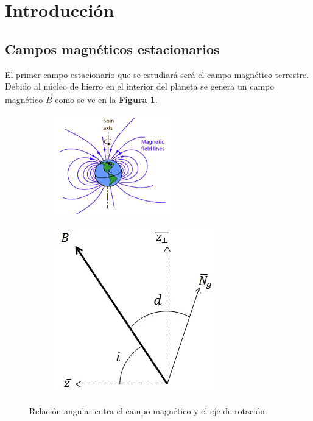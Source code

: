 \documentclass[11pt,a4paper]{article}
\begin{document}
\section{Introducción}\label{sec:intro}

\subsection{Campos magnéticos estacionarios}

El primer campo estacionario que se estudiará será el campo magnético terrestre. Debido al núcleo de hierro en el interior del planeta se genera un campo magnético $\vec{B}$ como se ve en la \textbf{Figura \ref{subfig:Campo_B}}.

\begin{figure}[h]

\begin{subfigure}{0.5\textwidth}
\centering
\includegraphics[scale=.8]{Campo.png}
	\label{subfig:Campo_B}
\end{subfigure}
\begin{subfigure}{0.5\textwidth}
\centering
\includegraphics[scale=.65]{angulos_campo.jpg}
	\label{subfig:Angulos}
\end{subfigure}
\caption{Relación angular entra el campo magnético y el eje de rotación.}
\end{figure}
\end{document}
